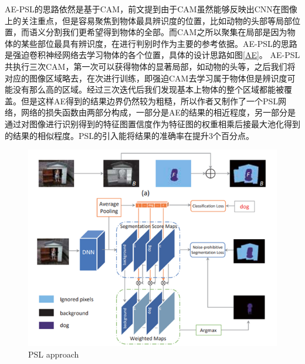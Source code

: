 \documentclass{article}
\begin{document}
\begin{CJK}{UTF8}{gbsn}
AE-PSL\cite{wei2017object}的思路依然是基于CAM\cite{zhou2016learning}，前文提到由于CAM\cite{zhou2016learning}虽然能够反映出CNN在图像上的关注重点，但是容易聚焦到物体最具辨识度的位置，比如动物的头部等局部位置，而语义分割我们更希望得到物体的全部。而CAM\cite{zhou2016learning}之所以聚集在局部是因为物体的某些部位最具有辨识度，在进行判别时作为主要的参考依据。AE-PSL\cite{wei2017object}的思路是强迫卷积神经网络去学习物体的各个位置，具体的设计思路如图\ref{AE}。
AE-PSL\cite{wei2017object}共执行三次CAM\cite{zhou2016learning}，第一次可以获得物体的显著局部，如动物的头等，之后我们将对应的图像区域略去，在次进行训练，即强迫CAM\cite{zhou2016learning}去学习属于物体但是辨识度可能没有那么高的区域。经过三次迭代后我们发现基本上物体的整个区域都能被覆盖。但是这样AE得到的结果边界仍然较为粗糙，所以作者又制作了一个PSL网络，网络的损失函数由两部分构成，一部分是AE的结果的相近程度，另一部分是通过对图像进行识别得到的特征图置信度作为特征图的权重相乘后接最大池化得到的结果的相似程度。PSL的引入能将结果的准确率在提升3个百分点。
\begin{figure}[h]
    \centering
    \includegraphics[scale=0.7]{imgs/2-10_PSL_approach.png}
    \caption{PSL approach}
    \label{PSL}
\end{figure}


\end{CJK}
\end{document}
